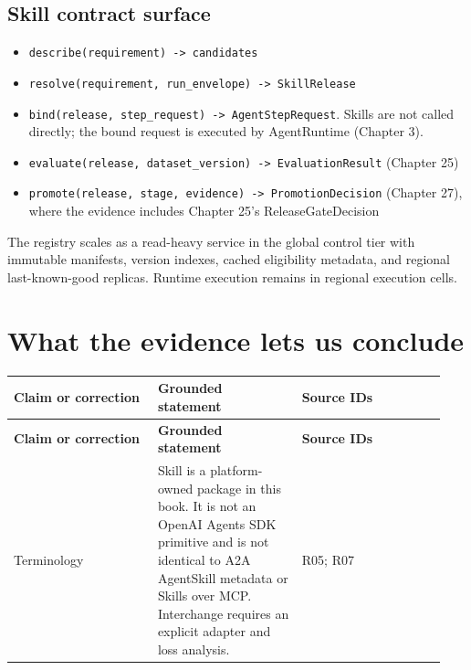 \subsection{Skill contract surface}

\begin{itemize}

\item \lstinline[style=bookinline]!describe(requirement) -> candidates!

\item \lstinline[style=bookinline]!resolve(requirement, run_envelope) -> SkillRelease!

\item \lstinline[style=bookinline]!bind(release, step_request) -> AgentStepRequest!. Skills are not called directly; the bound request is executed by AgentRuntime (Chapter 3).

\item \lstinline[style=bookinline]!evaluate(release, dataset_version) -> EvaluationResult! (Chapter 25)

\item \lstinline[style=bookinline]!promote(release, stage, evidence) -> PromotionDecision! (Chapter 27), where the evidence includes Chapter 25's ReleaseGateDecision

\end{itemize}

The registry scales as a read-heavy service in the global control tier with immutable manifests, version indexes, cached eligibility metadata, and regional last-known-good replicas. Runtime execution remains in regional execution cells.\par

\section{What the evidence lets us conclude}

\BookTableStart
\small
\begin{longtable}{@{}Y{0.3133\linewidth}Y{0.3133\linewidth}Y{0.3133\linewidth}@{}}
\color{white}\bfseries \textbf{Claim or correction} & \color{white}\bfseries \textbf{Grounded statement} & \color{white}\bfseries \textbf{Source IDs} \\
\endfirsthead
{}
\color{white}\bfseries \textbf{Claim or correction} & \color{white}\bfseries \textbf{Grounded statement} & \color{white}\bfseries \textbf{Source IDs} \\
\endhead
Terminology & Skill is a platform-owned package in this book. It is not an OpenAI Agents SDK primitive and is not identical to A2A AgentSkill metadata or Skills over MCP. Interchange requires an explicit adapter and loss analysis. & R05; R07 \\
\end{longtable}
\BookTableEnd

